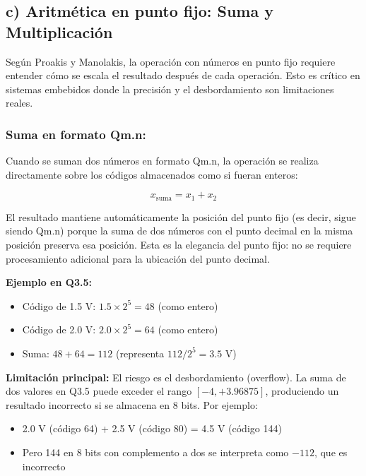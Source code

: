 \documentclass[12pt]{article}
\begin{document}
\subsection*{c) Aritmética en punto fijo: Suma y Multiplicación}
 
Según Proakis y Manolakis, la operación con números en punto fijo requiere entender cómo se escala el resultado después de cada operación. Esto es crítico en sistemas embebidos donde la precisión y el desbordamiento son limitaciones reales.
 
\subsubsection*{Suma en formato Qm.n:}
 
Cuando se suman dos números en formato Qm.n, la operación se realiza directamente sobre los códigos almacenados como si fueran enteros:
 
\begin{equation}
x_{\text{suma}} = x_1 + x_2
\end{equation}
 
El resultado mantiene automáticamente la posición del punto fijo (es decir, sigue siendo Qm.n) porque la suma de dos números con el punto decimal en la misma posición preserva esa posición. Esta es la elegancia del punto fijo: no se requiere procesamiento adicional para la ubicación del punto decimal.
 
\textbf{Ejemplo en Q3.5:}
\begin{itemize}
    \item Código de 1.5 V: $1.5 \times 2^5 = 48$ (como entero)
    \item Código de 2.0 V: $2.0 \times 2^5 = 64$ (como entero)
    \item Suma: $48 + 64 = 112$ (representa $112 / 2^5 = 3.5$ V) \checkmark
\end{itemize}
 
\textbf{Limitación principal:} El riesgo es el desbordamiento (overflow). La suma de dos valores en Q3.5 puede exceder el rango $[-4, +3.96875]$, produciendo un resultado incorrecto si se almacena en 8 bits. Por ejemplo:
\begin{itemize}
    \item 2.0 V (código 64) + 2.5 V (código 80) = 4.5 V (código 144)
    \item Pero 144 en 8 bits con complemento a dos se interpreta como $-112$, que es incorrecto
\end{itemize}
 
\end{document}
